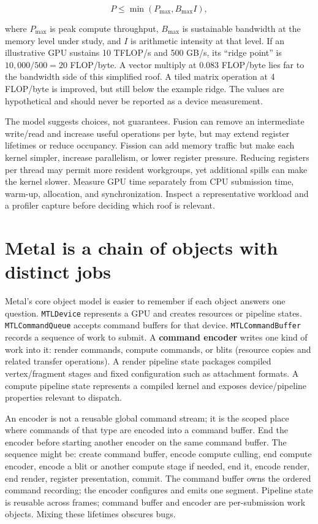 \[
P\le \min(P_{\max}, B_{\max} I),
\]

where \(P_{\max}\) is peak compute throughput, \(B_{\max}\) is sustainable bandwidth at the memory level under study, and \(I\) is arithmetic intensity at that level. If an illustrative GPU sustains 10 TFLOP/s and 500 GB/s, its ``ridge point'' is \(10{,}000/500=20\) FLOP/byte. A vector multiply at 0.083 FLOP/byte lies far to the bandwidth side of this simplified roof. A tiled matrix operation at 4 FLOP/byte is improved, but still below the example ridge. The values are hypothetical and should never be reported as a device measurement.

The model suggests choices, not guarantees. Fusion can remove an intermediate write/read and increase useful operations per byte, but may extend register lifetimes or reduce occupancy. Fission can add memory traffic but make each kernel simpler, increase parallelism, or lower register pressure. Reducing registers per thread may permit more resident workgroups, yet additional spills can make the kernel slower. Measure GPU time separately from CPU submission time, warm-up, allocation, and synchronization. Inspect a representative workload and a profiler capture before deciding which roof is relevant.

\section{Metal is a chain of objects with distinct jobs}\label{05-engine-i-ch019-metal-is-a-chain-of-objects-with-distinct-jobs}

Metal's core object model is easier to remember if each object answers one question. \texttt{MTLDevice} represents a GPU and creates resources or pipeline states. \texttt{MTLCommandQueue} accepts command buffers for that device. \texttt{MTLCommandBuffer} records a sequence of work to submit. A \textbf{command encoder} writes one kind of work into it: render commands, compute commands, or blits (resource copies and related transfer operations). A render pipeline state packages compiled vertex/fragment stages and fixed configuration such as attachment formats. A compute pipeline state represents a compiled kernel and exposes device/pipeline properties relevant to dispatch.

An encoder is not a reusable global command stream; it is the scoped place where commands of that type are encoded into a command buffer. End the encoder before starting another encoder on the same command buffer. The sequence might be: create command buffer, encode compute culling, end compute encoder, encode a blit or another compute stage if needed, end it, encode render, end render, register presentation, commit. The command buffer owns the ordered command recording; the encoder configures and emits one segment. Pipeline state is reusable across frames; command buffer and encoder are per-submission work objects. Mixing these lifetimes obscures bugs.

